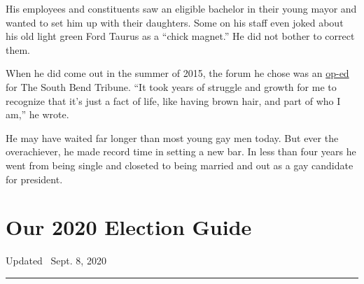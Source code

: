 His employees and constituents saw an eligible bachelor in their young
mayor and wanted to set him up with their daughters. Some on his staff
even joked about his old light green Ford Taurus as a ``chick magnet.''
He did not bother to correct them.

When he did come out in the summer of 2015, the forum he chose was an
\href{https://www.southbendtribune.com/news/local/south-bend-mayor-why-coming-out-matters/article_4dce0d12-1415-11e5-83c0-739eebd623ee.html}{op-ed}
for The South Bend Tribune. ``It took years of struggle and growth for
me to recognize that it's just a fact of life, like having brown hair,
and part of who I am,'' he wrote.

He may have waited far longer than most young gay men today. But ever
the overachiever, he made record time in setting a new bar. In less than
four years he went from being single and closeted to being married and
out as a gay candidate for president.

\hypertarget{our-2020-election-guide}{%
\section{Our 2020 Election Guide}\label{our-2020-election-guide}}

Updated ~Sept. 8, 2020

\begin{center}\rule{0.5\linewidth}{\linethickness}\end{center}

